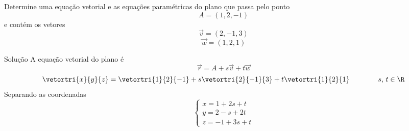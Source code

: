 \begin{question}
  Determine uma equação vetorial e as equações paramétricas do plano que passa pelo ponto
  \[
    A = (1, 2, -1)
  \]
  e contém os vetores
  \[
    \vec{v} = (2, -1, 3)
  \]
  \[
    \vec{w} = (1, 2, 1)
  \]
\end{question}

\begin{resolution}{Solução}
  A equação vetorial do plano é
  \[
    \vec{r} = A + s\vec{v} + t\vec{w}
  \]
  \pause
  \[
    \vetortri{x}{y}{z}
    = \vetortri{1}{2}{-1}
    + s\vetortri{2}{-1}{3}
    + t\vetortri{1}{2}{1}
    \qquad\qquad
    s, \, t \in \R
  \]
  \pause
  Separando as coordenadas
  \[
    \begin{cases}
      x =  1 + 2s +  t  \\
      y =  2 -  s + 2t  \\
      z = -1 + 3s + t
    \end{cases}
  \]
\end{resolution}

\endinput
